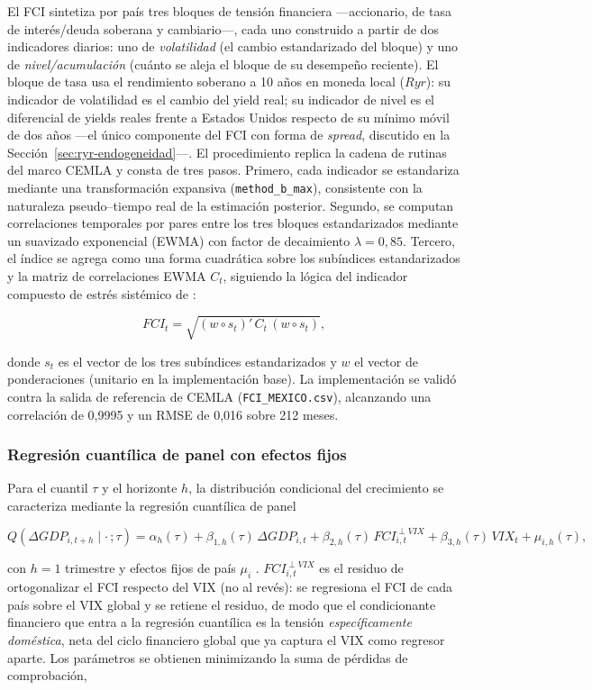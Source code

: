 El FCI sintetiza por país tres bloques de tensión financiera —accionario, de tasa de interés/deuda soberana y cambiario—, cada uno construido a partir de dos indicadores diarios: uno de \emph{volatilidad} (el cambio estandarizado del bloque) y uno de \emph{nivel/acumulación} (cuánto se aleja el bloque de su desempeño reciente). El bloque de tasa usa el rendimiento soberano a 10 años en moneda local (\texorpdfstring{$Ryr$}{Ryr}): su indicador de volatilidad es el cambio del yield real; su indicador de nivel es el diferencial de yields reales frente a Estados Unidos respecto de su mínimo móvil de dos años —el único componente del FCI con forma de \emph{spread}, discutido en la Sección~\ref{sec:ryr-endogeneidad}—. El procedimiento replica la cadena de rutinas del marco CEMLA y consta de tres pasos. Primero, cada indicador se estandariza mediante una transformación expansiva (\texttt{method\_b\_max}), consistente con la naturaleza pseudo–tiempo real de la estimación posterior. Segundo, se computan correlaciones temporales por pares entre los tres bloques estandarizados mediante un suavizado exponencial (EWMA) con factor de decaimiento $\lambda = 0{,}85$. Tercero, el índice se agrega como una forma cuadrática sobre los subíndices estandarizados y la matriz de correlaciones EWMA $C_t$, siguiendo la lógica del indicador compuesto de estrés sistémico de \citet{HolloKremerLoDuca2012}:

\[ FCI_t = \sqrt{(w \circ s_t)'\,C_t\,(w \circ s_t)}, \]

donde $s_t$ es el vector de los tres subíndices estandarizados y $w$ el vector de ponderaciones (unitario en la implementación base). La implementación se validó contra la salida de referencia de CEMLA (\texttt{FCI\_MEXICO.csv}), alcanzando una correlación de 0,9995 y un RMSE de 0,016 sobre 212 meses.

\subsubsection{Regresión cuantílica de panel con efectos fijos}

Para el cuantil $\tau$ y el horizonte $h$, la distribución condicional del crecimiento se caracteriza mediante la regresión cuantílica de panel

\[ Q\!\left(\Delta GDP_{i,t+h}\mid \cdot\,;\tau\right) = \alpha_h(\tau) + \beta_{1,h}(\tau)\,\Delta GDP_{i,t} + \beta_{2,h}(\tau)\,FCI^{\perp VIX}_{i,t} + \beta_{3,h}(\tau)\,VIX_t + \mu_{i,h}(\tau), \]

con $h = 1$ trimestre y efectos fijos de país $\mu_i$ \citep{Koenker2004}. $FCI^{\perp VIX}_{i,t}$ es el residuo de ortogonalizar el FCI respecto del VIX (no al revés): se regresiona el FCI de cada país sobre el VIX global y se retiene el residuo, de modo que el condicionante financiero que entra a la regresión cuantílica es la tensión \emph{específicamente doméstica}, neta del ciclo financiero global que ya captura el VIX como regresor aparte. Los parámetros se obtienen minimizando la suma de pérdidas de comprobación,

